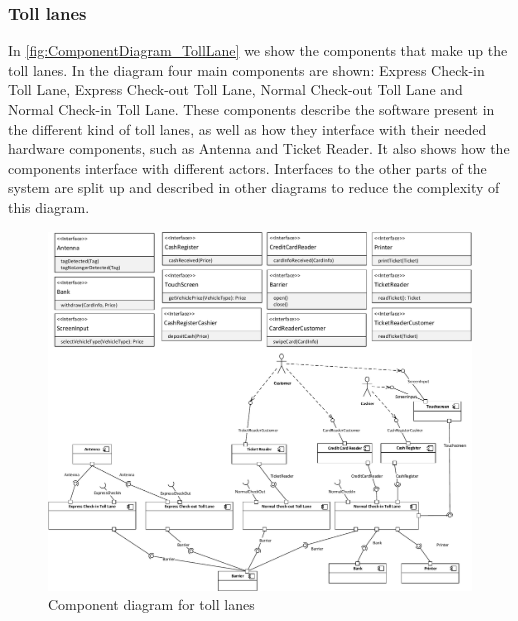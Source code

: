 \subsubsection*{Toll lanes}
In \autoref{fig:ComponentDiagram_TollLane} we show the components that make up the toll lanes. In the diagram four main components are shown: Express Check-in Toll Lane, Express Check-out Toll Lane, Normal Check-out Toll Lane and Normal Check-in Toll Lane. These components describe the software present in the different kind of toll lanes, as well as how they interface with their needed hardware components, such as Antenna and Ticket Reader. It also shows how the components interface with different actors. Interfaces to the other parts of the system are split up and described in other diagrams to reduce the complexity of this diagram.
\begin{figure}[H]
\centering
\includegraphics[width=1\textwidth]{img/component_diagrams/componentdiagram_tolllane}
\caption{Component diagram for toll lanes}
\label{fig:ComponentDiagram_TollLane}
\end{figure}